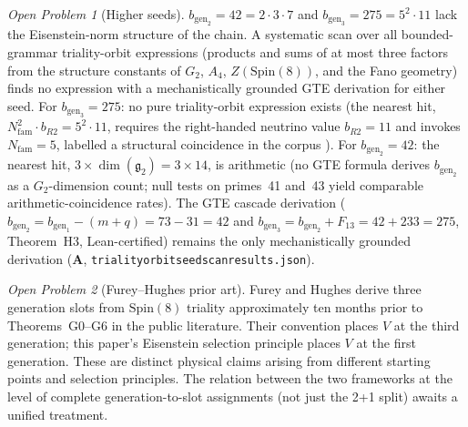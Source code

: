 \documentclass[11pt]{article}
\theoremstyle{remark}
\newtheorem{openprob}{Open Problem}
\newcommand{\lean}[1]{%
  \penalty-100
  \begingroup\def\_{\textunderscore\allowbreak}\texttt{#1}\endgroup}
\newcommand{\CatA}{\textbf{A}}
\begin{document}
\begin{openprob}[Higher seeds]
$b_{\mathrm{gen}_2} = 42 = 2\cdot 3\cdot 7$ and
$b_{\mathrm{gen}_3} = 275 = 5^2\cdot 11$ lack the Eisenstein-norm structure
of the chain.
A systematic scan over all bounded-grammar triality-orbit expressions
(products and sums of at most three factors from the structure constants of
$G_2$, $A_4$, $Z(\mathrm{Spin}(8))$, and the Fano geometry) finds no
expression with a mechanistically grounded GTE derivation for either seed.
For $b_{\mathrm{gen}_3} = 275$: no pure triality-orbit expression exists
(the nearest hit, $N_{\mathrm{fam}}^2\cdot b_{R2} = 5^2\cdot 11$, requires
the right-handed neutrino value $b_{R2}=11$ and invokes $N_{\mathrm{fam}}=5$,
labelled a structural coincidence in the corpus
\cite{SpivackGTECompleteFramework}).
For $b_{\mathrm{gen}_2} = 42$: the nearest hit,
$3\times\dim(\mathfrak{g}_2) = 3\times 14$, is arithmetic (no GTE formula
derives $b_{\mathrm{gen}_2}$ as a $G_2$-dimension count; null tests on
primes~41 and~43 yield comparable arithmetic-coincidence rates).
The GTE cascade derivation ($b_{\mathrm{gen}_2} = b_{\mathrm{gen}_1}-(m+q) = 73-31 = 42$
and $b_{\mathrm{gen}_3} = b_{\mathrm{gen}_2}+F_{13} = 42+233 = 275$,
Theorem~H3, Lean-certified) remains the only mechanistically grounded derivation
(\CatA, \lean{triality\_orbit\_seed\_scan\_results.json}).
\end{openprob}

\begin{openprob}[Furey--Hughes prior art]
Furey and Hughes \cite{FureyHughes2025} derive three generation slots from
$\mathrm{Spin}(8)$ triality approximately ten months prior to Theorems~G0--G6
in the public literature. Their convention places $V$ at the third generation;
this paper's Eisenstein selection principle places $V$ at the first generation.
These are distinct physical claims arising from different starting points
and selection principles. The relation between the two frameworks at the level
of complete generation-to-slot assignments (not just the 2+1 split) awaits
a unified treatment.
\end{openprob}
\end{document}
